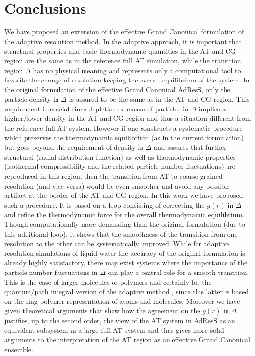 \documentclass[aps,pre,preprint]{revtex4}
\begin{document}
\section{Conclusions}
We have proposed an extension of the effective Grand Canonical formulation of the adaptive resolution method. In the adaptive approach, it is important that structural properties and basic thermodynamic quantities in the AT and CG region are the same as in the reference full AT simulation, while the transition region $\Delta$ has no physical meaning and represents only a computational tool to favorite the change of resolution keeping the overall equilibrium of the system. In the original formulation of the effective Grand Canonical AdResS, only the particle density in $\Delta$ is assured to be the same as in the AT and CG region. This requirement is crucial since depletion or excess of particles in $\Delta$ implies a higher/lower density in the AT and CG region and thus a situation different from the reference full AT system.  However if one constructs a systematic procedure which preserves the thermodynamic equilibrium (as in the current formulation) but goes beyond the requirement of density in $\Delta$ and assures that further structural (radial distribution function) as well as thermodynamic properties (isothermal compressibility and the related particle number fluctuations) are reproduced in this region, then the transition from AT to coarse-grained resolution (and vice versa) would be even smoother and avoid any possible artifact at the border of the AT and CG region. In this work we have proposed such a procedure. It is based on a loop consisting of correcting the $g(r)$ in $\Delta$ and refine the thermodynamic force for the overall thermodynamic equilibrium. Though computationally more demanding than the original formulation (due to this additional loop), it shows that the smoothness of the transition from one resolution to the other can be systematically improved. While for adaptive resolution simulations of liquid water the accuracy of the original formulation is already highly satisfactory, there may exist systems where the importance of the particle number fluctuations in $\Delta$ can play a central role for a smooth transition. This is the case of larger molecules or polymers \cite{jstatphyskurt} and certainly for the quantum/path integral version of the adaptive method \cite{adolfo1,adolfo2,raffaello}, since this latter is based on the ring-polymer representation of atoms and molecules. Moreover we have given theoretical arguments that show how the agreement on the $g(r)$ in $\Delta$ justifies, up to the second order, the view of the AT system in AdResS as an equivalent subsystem in a large full AT system and thus gives more solid arguments to the interpretation of the AT region as an effective Grand Canonical ensemble. 
\end{document}
